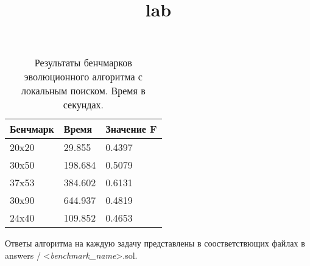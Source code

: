 \documentclass{article}
\title{lab}
\author{}
\date{}
\begin{document}
\setlength{\parindent}{35pt}
\setlength{\footnotemargin}{5pt}
\sloppy
\frenchspacing %



\begin{table}[!h]
    \begin{center}
        \begin{tabular}{ | m{4.2em} | m{5em} | m{5em} |}
            \hline
            Бенчмарк & Время   & Значение F \\
            \hline
            20x20    & 29.855  & 0.4397     \\
            \hline
            30x50    & 198.684 & 0.5079     \\
            \hline
            37x53    & 384.602 & 0.6131     \\
            \hline
            30x90    & 644.937 & 0.4819     \\
            \hline
            24x40    & 109.852 & 0.4653     \\
            \hline
        \end{tabular}
        \caption{Результаты бенчмарков эволюционного алгоритма с локальным поиском. Время в секундах.}
    \end{center}
\end{table}

Ответы алгоритма на каждую задачу представлены в соостветствющих файлах в
answers / <\textit{benchmark\_name}>.sol.
\end{document}
